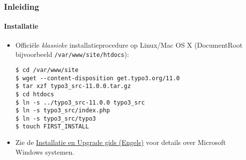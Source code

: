 %

\begin{frame}[fragile]
	\frametitle{Inleiding}
	\framesubtitle{Installatie}


	\begin{itemize}
		\item Offici\"ele \textit{klassieke} installatieprocedure op Linux/Mac OS X\newline
			(DocumentRoot bijvoorbeeld \texttt{/var/www/site/htdocs}):
\begin{lstlisting}
$ cd /var/www/site
$ wget --content-disposition get.typo3.org/11.0
$ tar xzf typo3_src-11.0.0.tar.gz
$ cd htdocs
$ ln -s ../typo3_src-11.0.0 typo3_src
$ ln -s typo3_src/index.php
$ ln -s typo3_src/typo3
$ touch FIRST_INSTALL
\end{lstlisting}

		\item Zie de \href{https://docs.typo3.org/m/typo3/guide-installation/master/en-us/}{Installatie en Upgrade gids (Engels)}
			voor details over Microsoft Windows systemen.

	\end{itemize}
\end{frame}

